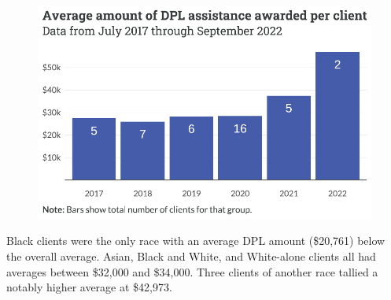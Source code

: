 \documentclass[
  letterpaper,
  DIV=11,
  numbers=noendperiod]{scrartcl}
\begin{document}
\begin{figure}[H]

{\centering \includegraphics{piedmont_files/figure-pdf/dpl-annual-1.pdf}

}

\end{figure}

Black clients were the only race with an average DPL amount (\$20,761)
below the overall average. Asian, Black and White, and White-alone
clients all had averages between \$32,000 and \$34,000. Three clients of
another race tallied a notably higher average at \$42,973.
\end{document}
